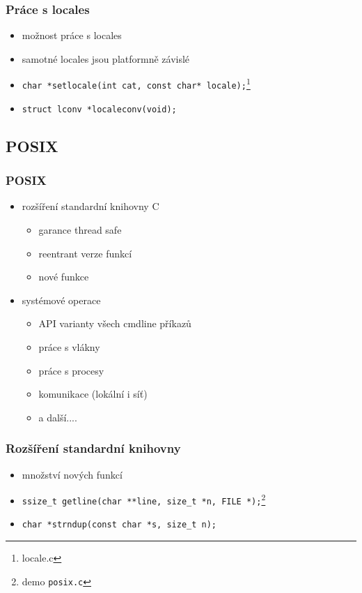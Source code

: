 \begin{frame}
	\frametitle{Práce s locales}
	\begin{itemize}
		\item{možnost práce s locales}
		\item{samotné locales jsou platformně závislé}
		\item{\texttt{char *setlocale(int cat, const char* locale);}\footnote{locale.c}}
		\item{\texttt{struct lconv *localeconv(void);}}
	\end{itemize}
\end{frame}

\subsection{POSIX}

\begin{frame}
	\frametitle{POSIX}
	\begin{itemize}
		\item{rozšíření standardní knihovny C}
		\begin{itemize}
			\item{garance thread safe}
			\item{reentrant verze funkcí}
			\item{nové funkce}
		\end{itemize}
		\item{systémové operace}
		\begin{itemize}
			\item{API varianty všech cmdline příkazů}
			\item{práce s vlákny}
			\item{práce s procesy}
			\item{komunikace (lokální i síť)}
			\item{a další....}
		\end{itemize}
	\end{itemize}
\end{frame}

\begin{frame}
	\frametitle{Rozšíření standardní knihovny}
	\begin{itemize}
		\item{množství nových funkcí}
		\item{\texttt{ssize\_t getline(char **line, size\_t *n, FILE *);}\footnote{demo \texttt{posix.c}}}
		\item{\texttt{char *strndup(const char *s, size\_t n);}}
	\end{itemize}
\end{frame}

